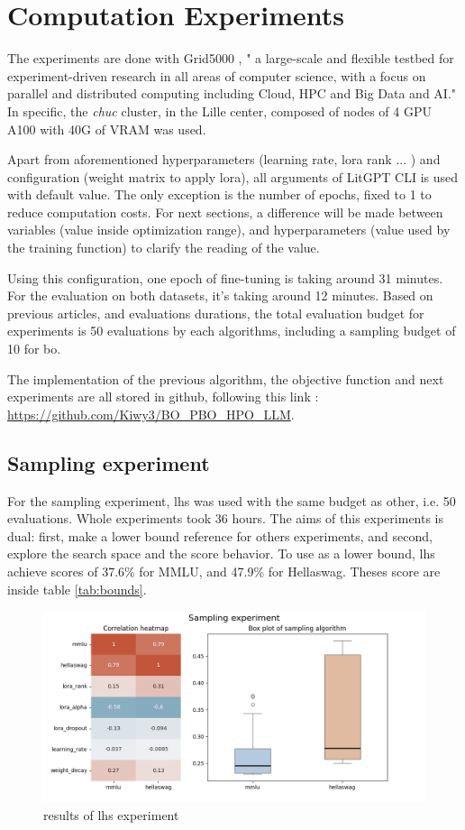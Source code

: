 \section{Computation Experiments }
\label{sec:comp_exp}
The experiments are done with Grid5000 \cite{balouek_adding_2012}, " a large-scale and flexible testbed for experiment-driven research in all areas of computer science, with a focus on parallel and distributed computing including Cloud, HPC and Big Data and AI." In specific, the \textit{chuc} cluster, in the Lille center, composed of nodes of 4 GPU A100 with 40G of VRAM was used. 

Apart from aforementioned hyperparameters (learning rate, \acrshort{lora} rank ... ) and configuration (weight matrix to apply \acrshort{lora}), all arguments of LitGPT CLI is used with default value. The only exception is the number of epochs, fixed to 1 to reduce computation costs. For next sections, a difference will be made between variables (value inside optimization range), and hyperparameters (value used by the training function) to clarify the reading of the value. 

Using this configuration, one epoch of fine-tuning is taking around 31 minutes. For the evaluation on both datasets, it's taking around 12 minutes. Based on previous articles, and evaluations durations, the total evaluation budget for experiments is 50 evaluations by each algorithms, including a sampling budget of 10 for \acrlong{bo}. 

The implementation of the previous algorithm, the objective function and next experiments are all stored in github, following this link : \url{https://github.com/Kiwy3/BO_PBO_HPO_LLM}.

\subsection{Sampling experiment}
\label{sec:samp_exp}

For the sampling experiment, \acrfull{lhs} was used with the same budget as other, i.e. 50 evaluations. Whole experiments took 36 hours. The aims of this experiments is dual: first, make a lower bound reference for others experiments, and second, explore the search space and the score behavior. To use as a lower bound, \acrshort{lhs} achieve scores of 37.6\% for MMLU, and 47.9\% for Hellaswag. Theses score are inside table \ref{tab:bounds}.

\begin{figure}
    \centering
    \includegraphics[width=0.6\linewidth]{figures/sampling/lhs.png}
    \caption{results of \acrlong{lhs} experiment}
    \label{fig:lhs_exp}
\end{figure}

